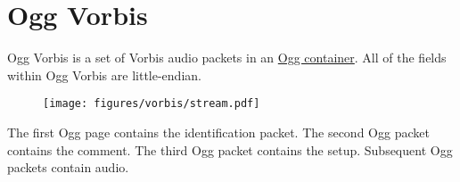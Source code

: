 
\chapter{Ogg Vorbis}
\label{vorbis}
Ogg Vorbis is a set of Vorbis audio packets
in an \hyperref[ogg]{Ogg container}.
All of the fields within Ogg Vorbis are little-endian.

\begin{figure}[h]
\texttt{[image: figures/vorbis/stream.pdf]}
\end{figure}
\par
\noindent
The first Ogg page contains the identification packet.
The second Ogg packet contains the comment.
The third Ogg packet contains the setup.
Subsequent Ogg packets contain audio.

\clearpage

